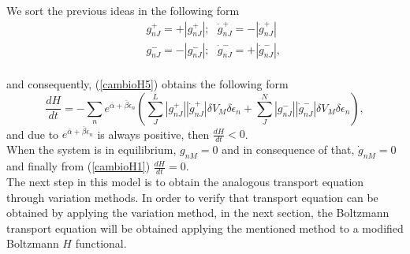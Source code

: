 \documentclass{article}
\begin{document}
We sort the previous ideas in the following form
\begin{eqnarray}
   &&g^{+}_{nJ}=+|g^{+}_{nJ}|; \ \ \  \dot{g}^{+}_{nJ}=-|\dot{g}^{+}_{nJ}| \nonumber \\
   &&g^{-}_{nJ}=-|g^{-}_{nJ}|; \ \ \ \dot{g}^{-}_{nJ}=+|\dot{g}^{-}_{nJ}| \label{separacion},
\end{eqnarray}{}
\\
and consequently, (\ref{cambioH5}) obtains the following form
\begin{equation}
    \frac{dH}{dt}=-\sum_n  e^{\bar{\alpha}+\bar{\beta}\epsilon_n}\left(\sum_J ^{L} |g^{+}_{nJ}||\dot{g}^{+}_{nJ}|\delta V_M \delta \epsilon_n+\sum^{N}_J  |g^{-}_{nJ}||\dot{g}^{-}_{nJ}|\delta V_M \delta \epsilon_n \right), \label{cambioH6}
\end{equation}{}
and due to $e^{\bar{\alpha}+\bar{\beta}\epsilon_n}$ is always positive, then $\frac{dH}{dt}<0$.\\
When the system is in equilibrium, $g_{nM}=0$ and in consequence of that, $\dot g_{nM}=0$ and finally from (\ref{cambioH1}) $\frac{dH}{dt}=0$. 
\\
The next step in this model is to obtain the analogous transport equation through variation methods. In order to verify that transport equation can be obtained by applying the variation method, in the next section, the Boltzmann transport equation will be obtained applying the mentioned method to a modified Boltzmann $H$ functional.
\end{document}
